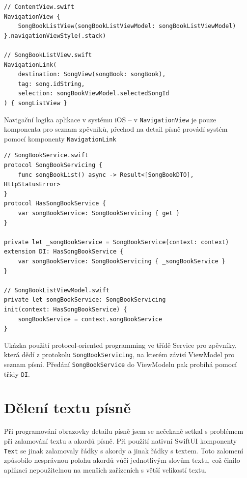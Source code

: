 \begin{listing}
\begin{verbatim}
// ContentView.swift
NavigationView {
    SongBookListView(songBookListViewModel: songBookListViewModel)
}.navigationViewStyle(.stack)

// SongBookListView.swift
NavigationLink(
    destination: SongView(songBook: songBook),
    tag: song.idString,
    selection: songBookViewModel.selectedSongId
) { songListView }
\end{verbatim}
\caption[Navigační logika aplikace v systému iOS]{Navigační logika aplikace v systému iOS -- v \texttt{NavigationView} je pouze komponenta pro seznam zpěvníků, přechod na detail písně provádí systém pomocí komponenty \texttt{NavigationLink}}
\end{listing}

\begin{listing}
\begin{verbatim}
// SongBookService.swift
protocol SongBookServicing {
    func songBookList() async -> Result<[SongBookDTO], HttpStatusError>
}
protocol HasSongBookService {
    var songBookService: SongBookServicing { get }
}

private let _songBookService = SongBookService(context: context)
extension DI: HasSongBookService {
    var songBookService: SongBookServicing { _songBookService }
}

// SongBookListViewModel.swift
private let songBookService: SongBookServicing
init(context: HasSongBookService) {
    songBookService = context.songBookService
}
\end{verbatim}
\caption[Ukázka použití protocol-oriented programming v aplikaci]{Ukázka použití protocol-oriented programming ve třídě Service pro zpěvníky, která dědí z protokolu \texttt{SongBookServicing}, na kterém závisí ViewModel pro seznam písní. Předání \texttt{SongBookService} do ViewModelu pak probíhá pomocí třídy \texttt{DI}.}
\end{listing}

\section{Dělení textu písně}

Při programování obrazovky detailu písně jsem se nečekaně setkal s problémem při zalamování textu a akordů písně. Při použití nativní SwiftUI komponenty \texttt{Text} \cite{swiftui-text} se jinak zalamovaly řádky s akordy a jinak řádky s textem. Toto zalomení způsobilo nesprávnou polohu akordů vůči jednotlivým slovům textu, což činilo aplikaci nepoužitelnou na menších zařízeních s větší velikostí textu.

